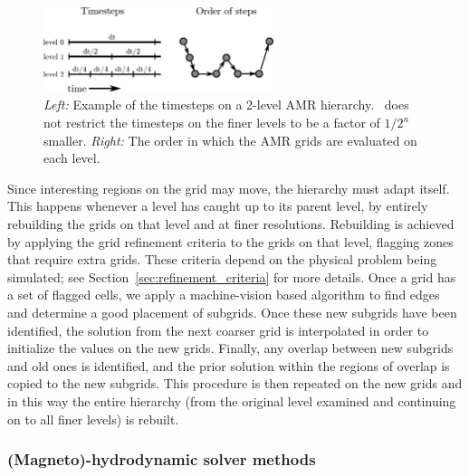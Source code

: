 \begin{figure}
\begin{center}
\includegraphics[width=0.6\textwidth]{figures/timestepping.eps}
\end{center}
\caption{\emph{Left:} Example of the timesteps on a 2-level AMR
  hierarchy.  \enzo\ does not restrict the timesteps on the finer levels
  to be a factor of $1/2^n$ smaller.  \emph{Right:} The order in which
  the AMR grids are evaluated on each level.\vspace{1ex}}
\label{fig:wcycle}
\end{figure}

Since interesting regions on the grid may move, the hierarchy must
adapt itself. This happens whenever a level has caught up to its
parent level, by entirely rebuilding the grids on that level and at
finer resolutions. Rebuilding is achieved by applying the grid
refinement criteria to the grids on that level, flagging zones that
require extra grids.  These criteria depend on the physical problem
being simulated; see Section~\ref{sec:refinement_criteria} for more
details.  Once a grid has a set of flagged cells, we apply a
machine-vision based algorithm \citep{Berger91} to find edges and
determine a good placement of subgrids.
Once these new subgrids have been identified, the solution from the
next coarser grid is interpolated in order to initialize the values on
the new grids.  Finally, any overlap between new subgrids and old ones
is identified, and the prior solution within the regions of overlap is
copied to the new subgrids. This procedure is then repeated on the new
grids and in this way the entire hierarchy (from the original level
examined and continuing on to all finer levels) is rebuilt.

\subsubsection{(Magneto)-hydrodynamic solver methods}

